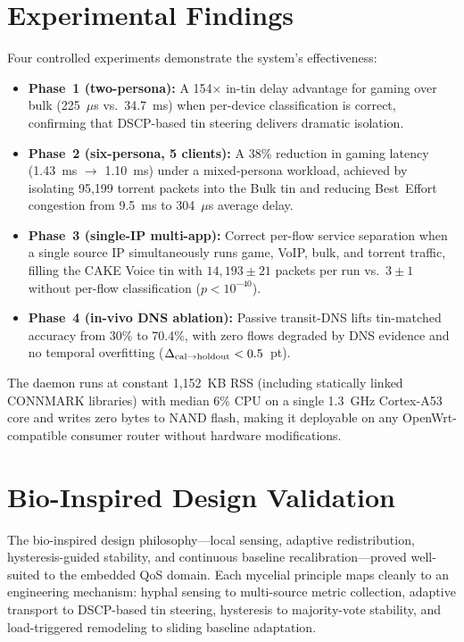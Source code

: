 \section{Experimental Findings}

Four controlled experiments demonstrate the system's effectiveness:

\begin{itemize}
  \item \textbf{Phase~1 (two-persona):} A 154$\times$ in-tin delay advantage for gaming over bulk (225~$\mu$s vs.\ 34.7~ms) when per-device classification is correct, confirming that DSCP-based tin steering delivers dramatic isolation.

  \item \textbf{Phase~2 (six-persona, 5 clients):} A 38\% reduction in gaming latency (1.43~ms $\to$ 1.10~ms) under a mixed-persona workload, achieved by isolating 95,199 torrent packets into the Bulk tin and reducing Best~Effort congestion from 9.5~ms to 304~$\mu$s average delay.

  \item \textbf{Phase~3 (single-IP multi-app):} Correct per-flow service separation when a single source IP simultaneously runs game, VoIP, bulk, and torrent traffic, filling the CAKE Voice tin with $14{,}193 \pm 21$ packets per run vs.\ $3 \pm 1$ without per-flow classification ($p < 10^{-40}$).

  \item \textbf{Phase~4 (in-vivo DNS ablation):} Passive transit-DNS lifts tin-matched accuracy from 30\% to 70.4\%, with zero flows degraded by DNS evidence and no temporal overfitting ($\Delta_{\rm cal\to holdout} < 0.5$~pt).
\end{itemize}

The daemon runs at constant 1,152~KB RSS (including statically linked CONNMARK libraries) with median 6\% CPU on a single 1.3~GHz Cortex-A53 core and writes zero bytes to NAND flash, making it deployable on any OpenWrt-compatible consumer router without hardware modifications.

\section{Bio-Inspired Design Validation}

The bio-inspired design philosophy---local sensing, adaptive redistribution, hysteresis-guided stability, and continuous baseline recalibration---proved well-suited to the embedded QoS domain. Each mycelial principle maps cleanly to an engineering mechanism: hyphal sensing to multi-source metric collection, adaptive transport to DSCP-based tin steering, hysteresis to majority-vote stability, and load-triggered remodeling to sliding baseline adaptation.

